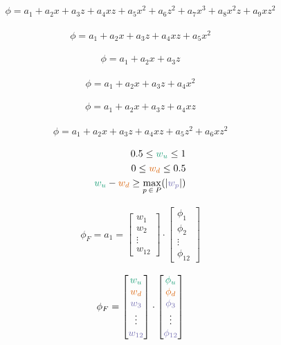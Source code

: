 \documentclass{article}
\begin{document}
\begin{align*}
\phi = a_1 + a_2 x + a_3 z + a_4 x z + a_5 x^2 + a_6 z^2 + a_7 x^3 + a_8 x^2 z + a_9 x z^2
\end{align*}

\begin{align*}
\phi = a_1 + a_2 x + a_3 z + a_4 x z + a_5 x^2
\end{align*}

\begin{align*}
\phi = a_1 + a_2 x + a_3 z
\end{align*}

\begin{align*}
\phi = a_1 + a_2 x + a_3 z + a_4 x^2
\end{align*}


\begin{align*}
\phi = a_1 + a_2 x + a_3 z + a_4 x z
\end{align*}

\begin{align*}
\phi = a_1 + a_2 x + a_3 z + a_4 x z + a_5 z^2 + a_6 x z^2
\end{align*}

\begin{align*}
	0.5 \leq \textcolor{u}{w_u} \leq 1 \\
	0 \leq \textcolor{d}{w_d} \leq 0.5 \\
	\textcolor{u}{w_u} - \textcolor{d}{w_d} \geq \max_{p\:\in\:P}(|\textcolor{p}{w_p}|)
\end{align*}

\begin{align*}
	\phi_F = a_1 = \begin{bmatrix}
		w_1 \\
		w_2 \\
		\vdots \\
		w_{12}
	\end{bmatrix}
	\cdot
	\begin{bmatrix}
		\phi_1 \\
		\phi_2 \\
		\vdots \\
		\phi_{12}
	\end{bmatrix}
\end{align*}

\begin{align*}
	\phi_F = \begin{bmatrix}
		\textcolor{u}{w_u} \\
		\textcolor{d}{w_d} \\
		\textcolor{p}{w_3} \\
		\vdots \\
		\textcolor{p}{w_{12}}
	\end{bmatrix}
	\cdot
	\begin{bmatrix}
		\textcolor{u}{\phi_u} \\
		\textcolor{d}{\phi_d} \\
		\textcolor{p}{\phi_3} \\
		\vdots \\
		\textcolor{p}{\phi_{12}}
	\end{bmatrix}
\end{align*}
\end{document}
